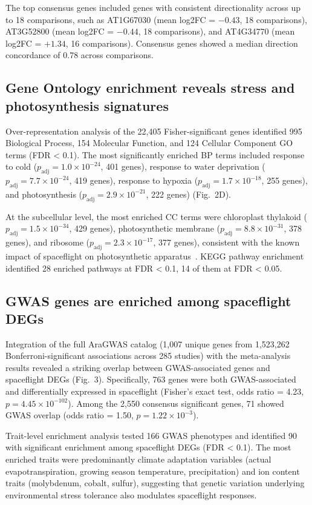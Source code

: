 \documentclass[sn-mathphys-num,Basic]{sn-jnl}
\begin{document}
The top consensus genes included genes with consistent directionality across up to 18 comparisons, such as AT1G67030 (mean log2FC = $-0.43$, 18 comparisons), AT3G52800 (mean log2FC = $-0.44$, 18 comparisons), and AT4G34770 (mean log2FC = $+1.34$, 16 comparisons). Consensus genes showed a median direction concordance of 0.78 across comparisons.

\subsection{Gene Ontology enrichment reveals stress and photosynthesis signatures}

Over-representation analysis of the 22,405 Fisher-significant genes identified 995 Biological Process, 154 Molecular Function, and 124 Cellular Component GO terms (FDR < 0.1). The most significantly enriched BP terms included response to cold ($p_{\text{adj}} = 1.0 \times 10^{-24}$, 401 genes), response to water deprivation ($p_{\text{adj}} = 7.7 \times 10^{-24}$, 419 genes), response to hypoxia ($p_{\text{adj}} = 1.7 \times 10^{-18}$, 255 genes), and photosynthesis ($p_{\text{adj}} = 2.9 \times 10^{-21}$, 222 genes) (Fig.~2D).

At the subcellular level, the most enriched CC terms were chloroplast thylakoid ($p_{\text{adj}} = 1.5 \times 10^{-34}$, 429 genes), photosynthetic membrane ($p_{\text{adj}} = 8.8 \times 10^{-31}$, 378 genes), and ribosome ($p_{\text{adj}} = 2.3 \times 10^{-17}$, 377 genes), consistent with the known impact of spaceflight on photosynthetic apparatus~\cite{Olanrewaju2023}. KEGG pathway enrichment identified 28 enriched pathways at FDR < 0.1, 14 of them at FDR < 0.05.

\subsection{GWAS genes are enriched among spaceflight DEGs}

Integration of the full AraGWAS catalog (1,007 unique genes from 1,523,262 Bonferroni-significant associations across 285 studies) with the meta-analysis results revealed a striking overlap between GWAS-associated genes and spaceflight DEGs (Fig.~3). Specifically, 763 genes were both GWAS-associated and differentially expressed in spaceflight (Fisher's exact test, odds ratio = 4.23, $p = 4.45 \times 10^{-102}$). Among the 2,550 consensus significant genes, 71 showed GWAS overlap (odds ratio = 1.50, $p = 1.22 \times 10^{-3}$).

Trait-level enrichment analysis tested 166 GWAS phenotypes and identified 90 with significant enrichment among spaceflight DEGs (FDR < 0.1). The most enriched traits were predominantly climate adaptation variables (actual evapotranspiration, growing season temperature, precipitation) and ion content traits (molybdenum, cobalt, sulfur), suggesting that genetic variation underlying environmental stress tolerance also modulates spaceflight responses.
\end{document}
